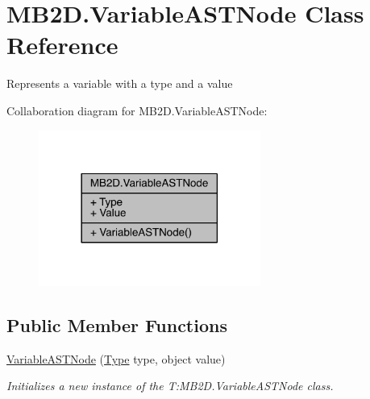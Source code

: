 \hypertarget{class_m_b2_d_1_1_variable_a_s_t_node}{}\section{M\+B2\+D.\+Variable\+A\+S\+T\+Node Class Reference}
\label{class_m_b2_d_1_1_variable_a_s_t_node}


Represents a variable with a type and a value  




Collaboration diagram for M\+B2\+D.\+Variable\+A\+S\+T\+Node\+:\nopagebreak
\begin{figure}[H]
\begin{center}
\leavevmode
\includegraphics[width=206pt]{class_m_b2_d_1_1_variable_a_s_t_node__coll__graph}
\end{center}
\end{figure}
\subsection*{Public Member Functions}
\begin{DoxyCompactItemize}
\item 
\hyperlink{class_m_b2_d_1_1_variable_a_s_t_node_a60c81f23a47577aefc76ecb9dc18d40f}{Variable\+A\+S\+T\+Node} (\hyperlink{class_m_b2_d_1_1_variable_a_s_t_node_a32549a5361b7664b945b4d9537a5b454}{Type} type, object value)
\begin{DoxyCompactList}\small\item\em Initializes a new instance of the T\+:\+M\+B2\+D.\+Variable\+A\+S\+T\+Node class. \end{DoxyCompactList}\end{DoxyCompactItemize}
